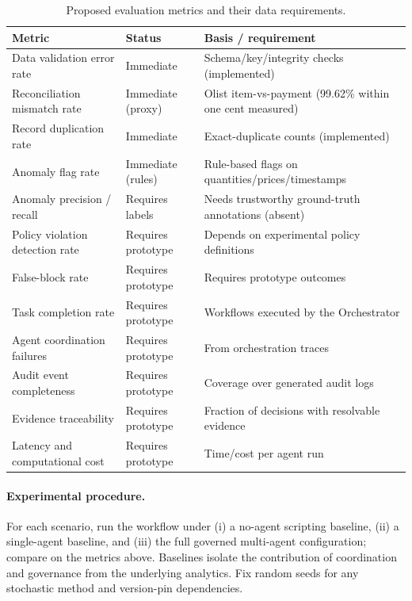 \documentclass[11pt,a4paper]{article}
\begin{document}
\begin{table}[H]
\centering
\small
\caption{Proposed evaluation metrics and their data requirements.}
\label{tab:metrics}
\begin{tabular}{L{5.0cm}L{3.4cm}L{5.6cm}}
\toprule
\textbf{Metric} & \textbf{Status} & \textbf{Basis / requirement} \\
\midrule
Data validation error rate & Immediate & Schema/key/integrity checks (implemented) \\
Reconciliation mismatch rate & Immediate (proxy) & Olist item-vs-payment (99.62\% within one cent measured) \\
Record duplication rate & Immediate & Exact-duplicate counts (implemented) \\
Anomaly flag rate & Immediate (rules) & Rule-based flags on quantities/prices/timestamps \\
Anomaly precision / recall & Requires labels & Needs trustworthy ground-truth annotations (absent) \\
Policy violation detection rate & Requires prototype & Depends on experimental policy definitions \\
False-block rate & Requires prototype & Requires prototype outcomes \\
Task completion rate & Requires prototype & Workflows executed by the Orchestrator \\
Agent coordination failures & Requires prototype & From orchestration traces \\
Audit event completeness & Requires prototype & Coverage over generated audit logs \\
Evidence traceability & Requires prototype & Fraction of decisions with resolvable evidence \\
Latency and computational cost & Requires prototype & Time/cost per agent run \\
\bottomrule
\end{tabular}
\end{table}

\paragraph{Experimental procedure.} For each scenario, run the workflow under (i) a no-agent scripting baseline, (ii) a single-agent baseline, and (iii) the full governed multi-agent configuration; compare on the metrics above. Baselines isolate the contribution of coordination and governance from the underlying analytics. Fix random seeds for any stochastic method and version-pin dependencies.
\end{document}
